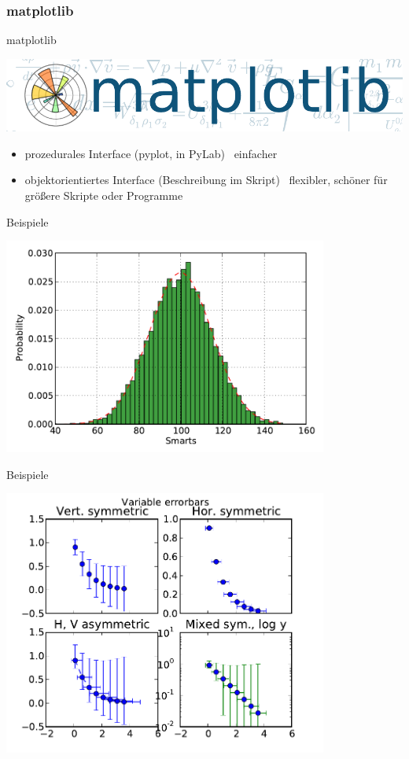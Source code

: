 \subsubsection{matplotlib}
\begin{frame}{matplotlib}
  \begin{center}
    \includegraphics[width=\textwidth]{../Notes/img/matplotlib.pdf}
  \end{center}
  \begin{itemize}
    \item prozedurales Interface (pyplot, in PyLab) \mdash\ einfacher
    \item objektorientiertes Interface (Beschreibung im Skript) \mdash\ flexibler, schöner für größere Skripte oder Programme
  \end{itemize}
\end{frame}

\begin{frame}{Beispiele}
  \begin{center}
    \includegraphics[width=0.8\textwidth]{img/matplotlib/hist.pdf}
  \end{center}
\end{frame}

\begin{frame}{Beispiele}
  \begin{center}
    \includegraphics[width=0.8\textwidth]{img/matplotlib/errorbars.pdf}
  \end{center}
\end{frame}

